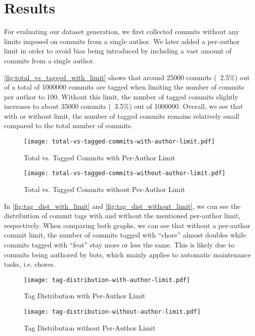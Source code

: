 \section{Results}
\label{sec:results}

For evaluating our dataset generation, we first collected commits without any limits imposed on commits from a single author. We later added a per-author limit in order to avoid bias being introduced by including a vast amount of commits from a single author.

\autoref{fig:total_vs_tagged_with_limit} shows that around 25000 commits (~2.5\%) out of a total of 1000000 commits are tagged when limiting the number of commits per author to 100. Without this limit, the number of tagged commits slightly increases to about 35000 commits (~3.5\%) out of 1000000. Overall, we see that with or without limit, the number of tagged commits remains relatively small compared to the total number of commits.

\begin{figure}[H]
  \centering
  \texttt{[image: total-vs-tagged-commits-with-author-limit.pdf]}
  \caption{Total vs. Tagged Commits with Per-Author Limit}
  \label{fig:total_vs_tagged_with_limit}
\end{figure}

\begin{figure}[H]
  \centering
  \texttt{[image: total-vs-tagged-commits-without-author-limit.pdf]}
  \caption{Total vs. Tagged Commits without Per-Author Limit}
  \label{fig:total_vs_tagged_without_limit}
\end{figure}


In \autoref{fig:tag_dist_with_limit} and \autoref{fig:tag_dist_without_limit}, we can see the distribution of commit tags with and without the mentioned per-author limit, respectively. When comparing both graphs, we can see that without a per-author commit limit, the number of commits tagged with “chore” almost doubles while commits tagged with “feat” stay more or less the same. This is likely due to commits being authored by bots, which mainly applies to automatic maintenance tasks, i.e. chores.

\begin{figure}[H]
  \centering
  \texttt{[image: tag-distribution-with-author-limit.pdf]}
  \caption{Tag Distribution with Per-Author Limit}
  \label{fig:tag_dist_with_limit}
\end{figure}

\begin{figure}[H]
  \centering
  \texttt{[image: tag-distribution-without-author-limit.pdf]}
  \caption{Tag Distribution without Per-Author Limit}
  \label{fig:tag_dist_without_limit}
\end{figure}

